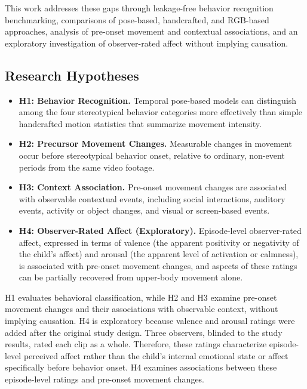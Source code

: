 \documentclass[10pt,twocolumn,letterpaper]{article}
\begin{document}
This work addresses these gaps through leakage-free behavior recognition benchmarking, comparisons of pose-based, handcrafted, and RGB-based approaches, analysis of pre-onset movement and contextual associations, and an exploratory investigation of observer-rated affect without implying causation.

\subsection{Research Hypotheses}

\begin{itemize}
    \item \textbf{H1: Behavior Recognition.} Temporal pose-based models can distinguish among the four stereotypical behavior categories more effectively than simple handcrafted motion statistics that summarize movement intensity.

    \item \textbf{H2: Precursor Movement Changes.} Measurable changes in movement occur before stereotypical behavior onset, relative to ordinary, non-event periods from the same video footage.

    \item \textbf{H3: Context Association.} Pre-onset movement changes are associated with observable contextual events, including social interactions, auditory events, activity or object changes, and visual or screen-based events.

    \item \textbf{H4: Observer-Rated Affect (Exploratory).} Episode-level observer-rated affect, expressed in terms of valence (the apparent positivity or negativity of the child's affect) and arousal (the apparent level of activation or calmness), is associated with pre-onset movement changes, and aspects of these ratings can be partially recovered from upper-body movement alone.
\end{itemize}

H1 evaluates behavioral classification, while H2 and H3 examine pre-onset movement changes and their associations with observable context, without implying causation. H4 is exploratory because valence and arousal ratings were added after the original study design. Three observers, blinded to the study results, rated each clip as a whole. Therefore, these ratings characterize episode-level perceived affect rather than the child's internal emotional state or affect specifically before behavior onset. H4 examines associations between these episode-level ratings and pre-onset movement changes.
\end{document}
